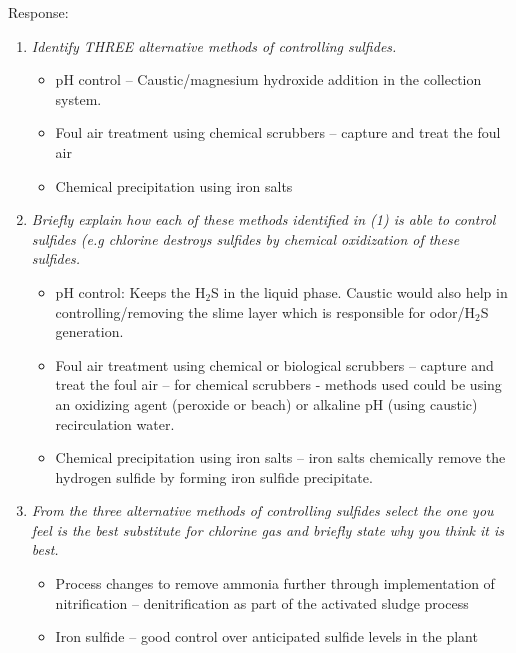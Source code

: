 \begin{enumerate}
Response:\\
\begin{enumerate}[label=\alph*]
\item \textit{Identify THREE alternative methods of controlling sulfides.}
\begin{itemize}
\item pH control – Caustic/magnesium hydroxide addition in the collection system.
\item Foul air treatment using chemical scrubbers – capture and treat the foul air
\item Chemical precipitation using iron salts
\end{itemize}
\item \textit{Briefly explain how each of these methods identified in (1) is able to control sulfides (e.g chlorine destroys sulfides by chemical oxidization of these sulfides.}
\begin{itemize}
\item pH control:  Keeps the H$_2$S in the liquid phase.  Caustic would also help in controlling/removing the slime layer which is responsible for odor/H$_2$S generation.
\item Foul air treatment using chemical or biological scrubbers – capture and treat the foul air – for chemical scrubbers - methods used could be using an oxidizing agent (peroxide or beach) or alkaline pH (using caustic) recirculation water.
\item Chemical precipitation using iron salts – iron salts chemically remove the hydrogen sulfide by forming iron sulfide precipitate.
\end{itemize}
\item \textit{From the three alternative methods of controlling sulfides select the one you feel is the best substitute for chlorine gas and briefly state why you think it is best.}
\begin{itemize}
\item Process changes to remove ammonia further through implementation of nitrification – denitrification as part of the activated sludge process
\item Iron sulfide – good control over anticipated sulfide levels in the plant
\end{itemize}	
\end{enumerate}


\end{enumerate}
